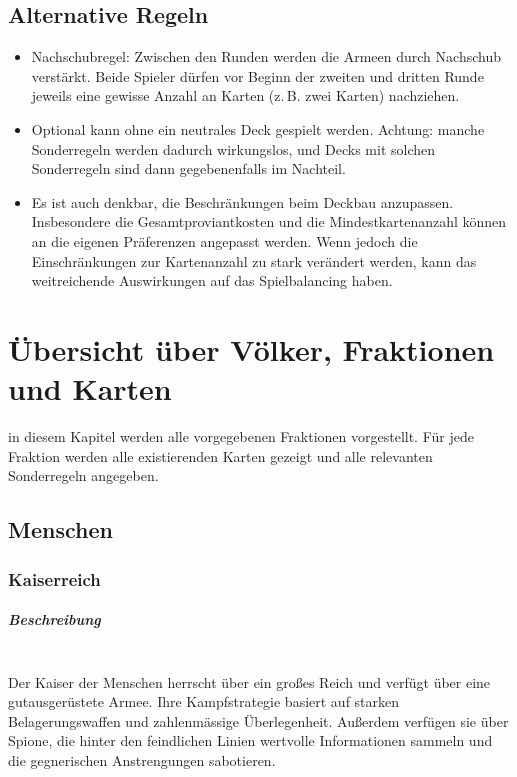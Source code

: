 \documentclass[a4paper,11pt]{report}
\begin{document}
\section{Alternative Regeln}
\begin{itemize}
	\item Nachschubregel: Zwischen den Runden werden die Armeen durch Nachschub verstärkt. Beide Spieler dürfen vor Beginn der zweiten und dritten Runde jeweils eine gewisse Anzahl an Karten (z.\,B. zwei Karten) nachziehen.
	\item Optional kann ohne ein neutrales Deck gespielt werden. Achtung: manche Sonderregeln werden dadurch wirkungslos, und Decks mit solchen Sonderregeln sind dann gegebenenfalls im Nachteil.
	\item Es ist auch denkbar, die Beschränkungen beim Deckbau anzupassen. Insbesondere die Gesamtproviantkosten und die Mindestkartenanzahl können an die eigenen Präferenzen angepasst werden. Wenn jedoch die Einschränkungen zur Kartenanzahl zu stark verändert werden, kann das weitreichende Auswirkungen auf das Spielbalancing haben.
\end{itemize}

\chapter{Übersicht über Völker, Fraktionen und Karten}
in diesem Kapitel werden alle vorgegebenen Fraktionen vorgestellt. Für jede Fraktion werden alle existierenden Karten gezeigt und alle relevanten Sonderregeln angegeben.

\section{Menschen}
\subsection{Kaiserreich}
\paragraph{Beschreibung}~\\
Der Kaiser der Menschen herrscht über ein großes Reich und verfügt über eine gutausgerüstete Armee. Ihre Kampfstrategie basiert auf starken Belagerungswaffen und zahlenmässige Überlegenheit. Außerdem verfügen sie über Spione, die hinter den feindlichen Linien wertvolle Informationen sammeln und die gegnerischen Anstrengungen sabotieren.
\end{document}
